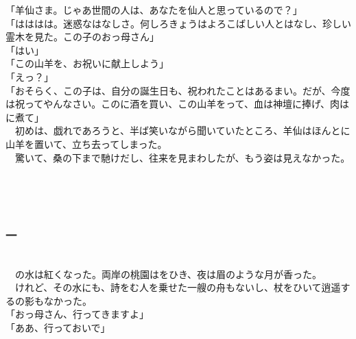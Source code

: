\documentclass[
  paper=a5,
  fontsize=10pt,
  jafontsize=9.5pt,
  tate,                  %
  open_bracket_pos=nibu, %
]{jlreq}
\begin{document}
「羊仙さま。じゃあ世間の人は、あなたを仙人と思っているので？」\\


「はははは。迷惑なはなしさ。何しろきょうはよろこばしい人とはなし、珍しい霊木を見た。この子のおっ母さん」\\


「はい」\\


「この山羊を、お祝いに献上しよう」\\


「えっ？」\\


「おそらく、この子は、自分の誕生日も、祝われたことはあるまい。だが、今度は祝ってやんなさい。このに酒を買い、この山羊をって、血は神壇に捧げ、肉はに煮て」\\


　初めは、戯れであろうと、半ば笑いながら聞いていたところ、羊仙はほんとに山羊を置いて、立ち去ってしまった。\\


　驚いて、桑の下まで馳けだし、往来を見まわしたが、もう姿は見えなかった。\\

\\

\subsection{}

\\

\subsubsection{一}

\\


　の水は紅くなった。両岸の桃園はをひき、夜は眉のような月が香った。\\


　けれど、その水にも、詩をむ人を乗せた一艘の舟もないし、杖をひいて逍遥するの影もなかった。\\


「おっ母さん、行ってきますよ」\\


「ああ、行っておいで」\\
\end{document}
